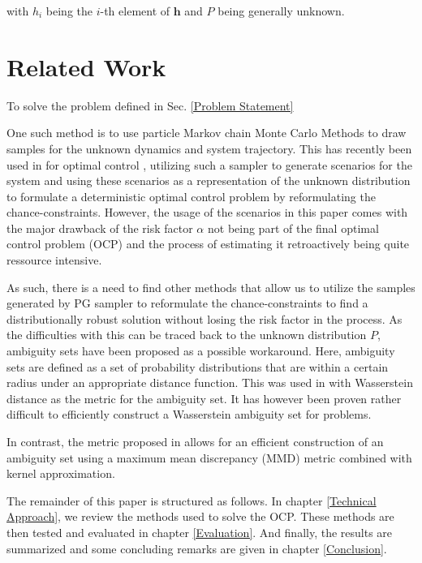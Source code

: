 with $h_i$ being the $i$-th element of $\boldsymbol{h}$ and $P$ being generally unknown.

\section{Related Work}


To solve the problem defined in Sec. \ref{Problem Statement}

One such method is to use particle Markov chain Monte Carlo Methods \cite{Andrieu_10} to draw samples for the unknown dynamics and system trajectory. This has recently been used in \cite{Robert_24} for optimal control , utilizing such a sampler to generate scenarios for the system and using these scenarios as a representation of the unknown distribution to formulate a deterministic optimal control problem by reformulating the chance-constraints. However, the usage of the scenarios in this paper comes with the major drawback of the risk factor $\alpha$ not being part of the final optimal control problem (OCP) and the process of estimating it retroactively being quite ressource intensive.

As such, there is a need to find other methods that allow us to utilize the samples generated by PG sampler to reformulate the chance-constraints to find a distributionally robust solution without losing the risk factor in the process. As the difficulties with this can be traced back to the unknown distribution $P$, ambiguity sets have been proposed as a possible workaround. Here, ambiguity sets are defined as a set of probability distributions that are within a certain radius under an appropriate distance function. This was used in \cite{Hota} with Wasserstein distance as the metric for the ambiguity set. It has however been proven rather difficult to efficiently construct a Wasserstein ambiguity set for problems. 

In contrast, the metric proposed in \cite{Yassine_22} allows for an efficient construction of an ambiguity set using a maximum mean discrepancy (MMD) metric combined with kernel approximation.

The remainder of this paper is structured as follows. In chapter \ref{Technical Approach}, we review the methods used to solve the OCP. These methods are then tested and evaluated in chapter \ref{Evaluation}. And finally, the results are summarized and some concluding remarks are given in chapter \ref{Conclusion}.





